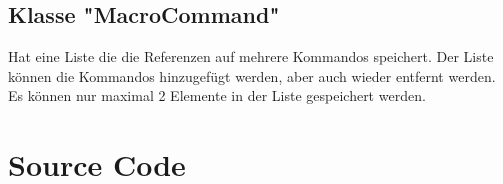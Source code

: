 \documentclass[12pt,a4paper]{article}
\begin{document}
\subsection {Klasse "MacroCommand"}
Hat eine Liste die die Referenzen auf mehrere Kommandos speichert. Der Liste können die Kommandos hinzugefügt werden, aber auch wieder entfernt werden. Es können nur maximal 2 Elemente in der Liste gespeichert werden.
\\




\newpage
\section {Source Code}

%
%
%
%
%
%
%
%
%
%
%
%
%
%
%
%
%
%
%
%
%
%
%
%
%
%
%
%
%
%
%
%
%
%
%
%
%
%
%
\end{document}
